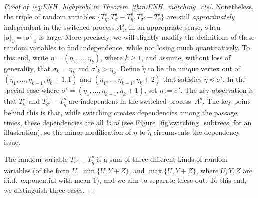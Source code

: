 \documentclass[11pt]{article}
\numberwithin{equation}{section}
\newcommand{\wt}{\widetilde} %
\theoremstyle{definition}
\begin{document}
\begin{proof}[Proof of~\eqref{eq:ENH_highprob} in Theorem~\ref{thm:ENH_matching_cts}]
Nonetheless, the triple of random variables 
$\{ T_{\eta}^{s}, T_{\sigma}^{s} - T_{\eta}^{s}, T_{\sigma'}^{s} - T_{\eta}^{s} \}$
are still \emph{approximately} independent in the switched process $A_{1}^{s}$, in an appropriate sense, when $|\sigma|_{1} = |\sigma'|_{1}$ is large. 
More precisely, we will slightly modify the definitions of these random variables to find independence, while not losing much quantitatively. 
To this end, 
write $\eta = \left( \eta_{1}, \ldots, \eta_{k} \right)$, 
where $k \geq 1$, 
and assume, without loss of generality, that 
$\sigma_{k} = \eta_{k}$ and $\sigma'_{k} > \eta_{k}$. 
Define $\wt{\eta}$ to be the unique vertex out of 
$\left( \eta_{1}, \ldots, \eta_{k-1}, \eta_{k} + 1, 1 \right)$ 
and 
$\left( \eta_{1}, \ldots, \eta_{k-1}, \eta_{k} + 2 \right)$ 
that satisfies 
$\wt{\eta} \preccurlyeq \sigma'$.  
In the special case where $\sigma' = \left( \eta_{1}, \ldots, \eta_{k-1}, \eta_{k} + 1 \right)$, 
set $\wt{\eta} := \sigma'$. 
The key observation is that $T_{\sigma}^{s}$ and $T_{\sigma'}^{s} - T_{\wt{\eta}}^{s}$ are independent in the switched process~$A_{1}^{s}$. 
The key point behind this is that, while switching creates dependencies among the passage times, these dependencies are all \emph{local} (see Figure~\ref{fig:switching_subtrees} for an illustration), so the minor modification of $\eta$ to $\wt{\eta}$ circumvents the dependency issue. 


The random variable $T_{\sigma'}^{s} - T_{\wt{\eta}}^{s}$ is a sum of three different kinds of random variables (of the form $U$, $\min\{ U, Y + Z \}$, and $\max\{ U, Y + Z \}$, where $U, Y, Z$ are i.i.d.\ exponential with mean $1$), and we aim to separate these out. To this end, we distinguish three cases. 


\end{proof}
\end{document}
